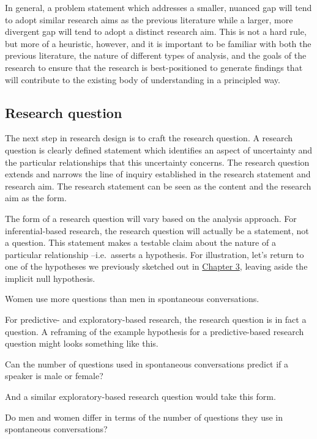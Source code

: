 \documentclass[
  letterpaper,
]{latex/krantz}
\begin{document}
In general, a problem statement which addresses a smaller, nuanced gap
will tend to adopt similar research aims as the previous literature
while a larger, more divergent gap will tend to adopt a distinct
research aim. This is not a hard rule, but more of a heuristic, however,
and it is important to be familiar with both the previous literature,
the nature of different types of analysis, and the goals of the research
to ensure that the research is best-positioned to generate findings that
will contribute to the existing body of understanding in a principled
way.

\hypertarget{research-question}{%
\subsection{Research question}\label{research-question}}

The next step in research design is to craft the research question. A
research question is clearly defined statement which identifies an
aspect of uncertainty and the particular relationships that this
uncertainty concerns. The research question extends and narrows the line
of inquiry established in the research statement and research aim. The
research statement can be seen as the content and the research aim as
the form.

The form of a research question will vary based on the analysis
approach. For inferential-based research, the research question will
actually be a statement, not a question. This statement makes a testable
claim about the nature of a particular relationship --i.e.~asserts a
hypothesis. For illustration, let's return to one of the hypotheses we
previously sketched out in
\protect\hyperlink{sec-approaching-analysis}{Chapter 3}, leaving aside
the implicit null hypothesis.

Women use more questions than men in spontaneous conversations.

For predictive- and exploratory-based research, the research question is
in fact a question. A reframing of the example hypothesis for a
predictive-based research question might looks something like this.

Can the number of questions used in spontaneous conversations predict if
a speaker is male or female?

And a similar exploratory-based research question would take this form.

Do men and women differ in terms of the number of questions they use in
spontaneous conversations?
\end{document}
